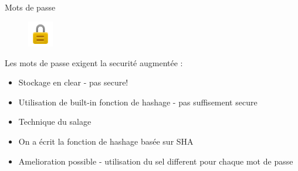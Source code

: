 \begin{frame}{Mots de passe}
\begin{figure}[h!]
  \includegraphics[width=0.10\textwidth]{images/website_-_padlock-512}
\end{figure}
  Les mots de passe exigent la securité augmentée : 
  \begin{itemize}
  \item Stockage en clear - pas secure!
  \item Utilisation de built-in fonction de hashage - pas suffisement secure
  \item Technique du salage
  \item On a écrit la fonction de hashage basée sur SHA
  \item Amelioration possible - utilisation du sel different pour chaque mot de passe
  \end{itemize}
\end{frame}